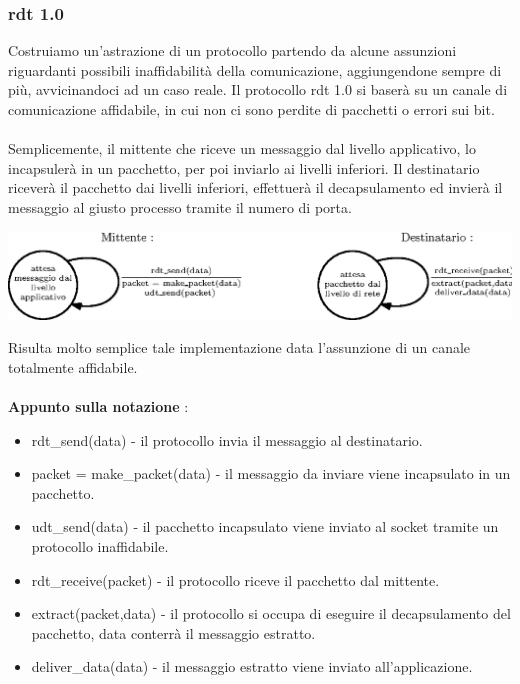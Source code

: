 \documentclass[12pt, letterpaper]{article}
\newcommand{\acc}{\\\hphantom{}\\}
\begin{document}
\subsubsection{rdt 1.0}
Costruiamo un'astrazione di un protocollo partendo da alcune assunzioni riguardanti possibili
inaffidabilità della comunicazione, aggiungendone sempre di più,
avvicinandoci ad un caso reale. Il protocollo rdt 1.0 si baserà su un
canale di comunicazione affidabile, in cui non ci sono perdite di
pacchetti o errori sui bit.\acc
Semplicemente, il mittente che riceve un messaggio dal livello applicativo,
lo incapsulerà in un pacchetto, per poi inviarlo ai livelli inferiori.
Il destinatario riceverà il pacchetto dai livelli inferiori,
effettuerà il decapsulamento ed invierà il messaggio al giusto
processo tramite il numero di porta.\begin{center}
    \includegraphics[width=\textwidth ]{images/rdt1.0.eps}
\end{center}
Risulta molto semplice tale implementazione data l'assunzione di un
canale totalmente affidabile.\acc
\textbf{Appunto sulla notazione} : \begin{itemize}
    \item rdt\_send(data) - il protocollo invia il messaggio al
          destinatario.
    \item packet = make\_packet(data) - il messaggio da inviare viene
          incapsulato in un pacchetto.
    \item udt\_send(data) - il pacchetto incapsulato viene inviato
          al socket tramite un protocollo inaffidabile.
    \item rdt\_receive(packet) - il protocollo riceve il pacchetto dal mittente. 
    \item extract(packet,data) - il protocollo si occupa di eseguire il decapsulamento del pacchetto,
    data conterrà il messaggio estratto. 
    \item deliver\_data(data) - il messaggio estratto viene inviato all'applicazione.
\end{itemize}
\end{document}
